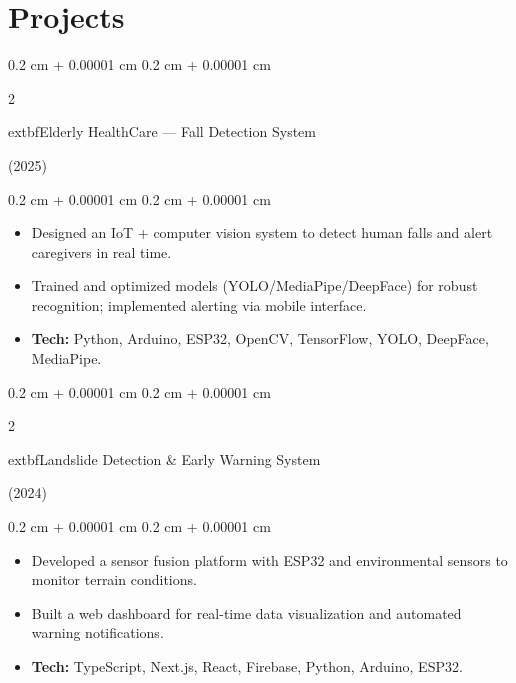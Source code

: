 \documentclass[10pt, letterpaper]{article}
\newenvironment{highlights}{
    \begin{itemize}[
        topsep=0.10 cm,
        parsep=0.10 cm,
        partopsep=0pt,
        itemsep=0pt,
        leftmargin=0.4 cm + 10pt
    ]
}{
    \end{itemize}
} %
\newenvironment{onecolentry}{
    \begin{adjustwidth}{
        0.2 cm + 0.00001 cm
    }{
        0.2 cm + 0.00001 cm
    }
}{
    \end{adjustwidth}
} %
\newenvironment{twocolentry}[2][]{
    \onecolentry
    \def\secondColumn{#2}
    \setcolumnwidth{\fill, 4.5 cm}
    \begin{paracol}{2}
}{
    \switchcolumn \raggedleft \secondColumn
    \end{paracol}
    \endonecolentry
} %
\let\hrefWithoutArrow\href
\renewcommand{\href}[2]{\hrefWithoutArrow{#1}{\ifthenelse{\equal{#2}{}}{ }{#2 }\raisebox{.15ex}{\footnotesize \faExternalLink*}}}
\begin{document}



    
    \section{Projects}

        \begin{twocolentry}{(2025)}
            	extbf{Elderly HealthCare — Fall Detection System}
        \end{twocolentry}

        \vspace{0.10 cm}
        \begin{onecolentry}
            \begin{highlights}
                \item Designed an IoT + computer vision system to detect human falls and alert caregivers in real time.
                \item Trained and optimized models (YOLO/MediaPipe/DeepFace) for robust recognition; implemented alerting via mobile interface.
                \item \textbf{Tech:} Python, Arduino, ESP32, OpenCV, TensorFlow, YOLO, DeepFace, MediaPipe.
            \end{highlights}
        \end{onecolentry}

        \vspace{0.2 cm}

        \begin{twocolentry}{(2024)}
            	extbf{Landslide Detection \& Early Warning System}
        \end{twocolentry}

        \vspace{0.10 cm}
        \begin{onecolentry}
            \begin{highlights}
                \item Developed a sensor fusion platform with ESP32 and environmental sensors to monitor terrain conditions.
                \item Built a web dashboard for real-time data visualization and automated warning notifications.
                \item \textbf{Tech:} TypeScript, Next.js, React, Firebase, Python, Arduino, ESP32.
            \end{highlights}
        \end{onecolentry}
\end{document}
